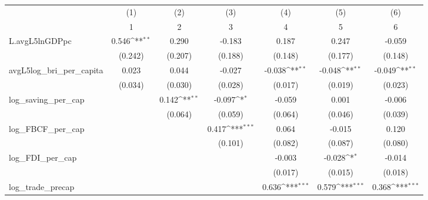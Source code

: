 {
\def\sym#1{\ifmmode^{#1}\else\(^{#1}\)\fi}
\begin{tabular}{l*{6}{c}}
\toprule
            &\multicolumn{1}{c}{(1)}&\multicolumn{1}{c}{(2)}&\multicolumn{1}{c}{(3)}&\multicolumn{1}{c}{(4)}&\multicolumn{1}{c}{(5)}&\multicolumn{1}{c}{(6)}\\
            &\multicolumn{1}{c}{1}&\multicolumn{1}{c}{2}&\multicolumn{1}{c}{3}&\multicolumn{1}{c}{4}&\multicolumn{1}{c}{5}&\multicolumn{1}{c}{6}\\
\midrule
L.avgL5lnGDPpc&       0.546\sym{**} &       0.290         &      -0.183         &       0.187         &       0.247         &      -0.059         \\
            &     (0.242)         &     (0.207)         &     (0.188)         &     (0.148)         &     (0.177)         &     (0.148)         \\
\addlinespace
avgL5log\_bri\_per\_capita&       0.023         &       0.044         &      -0.027         &      -0.038\sym{**} &      -0.048\sym{**} &      -0.049\sym{**} \\
            &     (0.034)         &     (0.030)         &     (0.028)         &     (0.017)         &     (0.019)         &     (0.023)         \\
\addlinespace
log\_saving\_per\_cap&                     &       0.142\sym{**} &      -0.097\sym{*}  &      -0.059         &       0.001         &      -0.006         \\
            &                     &     (0.064)         &     (0.059)         &     (0.064)         &     (0.046)         &     (0.039)         \\
\addlinespace
log\_FBCF\_per\_cap&                     &                     &       0.417\sym{***}&       0.064         &      -0.015         &       0.120         \\
            &                     &                     &     (0.101)         &     (0.082)         &     (0.087)         &     (0.080)         \\
\addlinespace
log\_FDI\_per\_cap&                     &                     &                     &      -0.003         &      -0.028\sym{*}  &      -0.014         \\
            &                     &                     &                     &     (0.017)         &     (0.015)         &     (0.018)         \\
\addlinespace
log\_trade\_precap&                     &                     &                     &       0.636\sym{***}&       0.579\sym{***}&       0.368\sym{***}\\

\end{tabular}}
